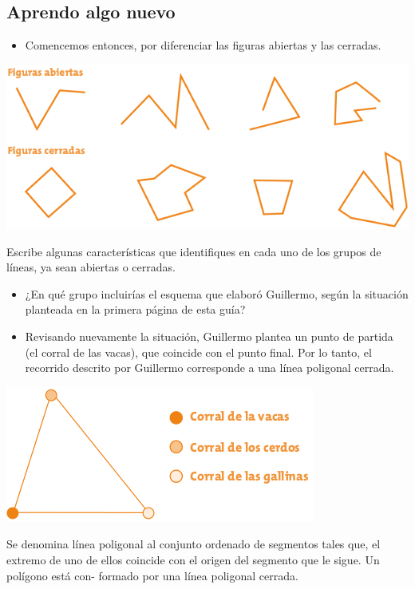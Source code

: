 \documentclass[letterpaper,11pt,twoside]{article}
\begin{document}
\begin{multicols}{2}
\section*{Aprendo algo nuevo}
\begin{itemize}
\item Comencemos entonces, por diferenciar las figuras
abiertas y las cerradas.
\end{itemize}
\begin{center}
\includegraphics[scale=.4]{Images/Fig_abiertas_cerradas.png} 
\end{center}
Escribe algunas características que identifiques en cada uno
de los grupos de líneas, ya sean abiertas o cerradas.
\begin{itemize}
\item ¿En qué grupo incluirías el esquema que elaboró
Guillermo, según la situación planteada en la primera
página de esta guía?
\item Revisando nuevamente la situación, Guillermo plantea
un punto de partida (el corral de las vacas), que coincide
con el punto final. Por lo tanto, el recorrido descrito por
Guillermo corresponde a una línea poligonal cerrada.
\end{itemize}
\begin{center}
\includegraphics[scale=.55]{Images/corrales.png}
\end{center}
Se denomina línea poligonal al conjunto ordenado de segmentos tales que, el extremo de uno de ellos coincide con
el origen del segmento que le sigue. Un polígono está con-
formado por una línea poligonal cerrada.


\end{multicols}
\end{document}
